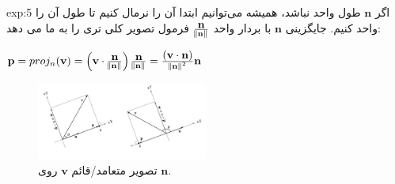 {\begin{spacing}{1.5}
\begin{example}{exp:5}
            اگر $\textbf{n}$ طول واحد نباشد، همیشه می‌توانیم ابتدا آن را نرمال کنیم تا طول آن را واحد کنیم.
            جایگزینی $\textbf{n}$ با بردار واحد $\frac{\displaystyle\textbf{n}}{\norm{\textbf{n}}}$ فرمول تصویر کلی تری را به ما می دهد:

            \begin{center}
                $\textbf{p}=proj_{n}(\textbf{v})=\left( \textbf{v}\cdot\frac{\displaystyle\textbf{n}}{\norm{\textbf{n}}} \right)\frac{\displaystyle\textbf{n}}{\norm{\textbf{n}}}=\frac{\displaystyle(\textbf{v}\cdot\textbf{n})}{\norm{\textbf{n}}^2}\textbf{n}$
            \end{center}

            \begin{figure}[H]
                \centering
                \setlength{\belowcaptionskip}{-10pt}
                \includegraphics[width=0.5\textwidth]{Images/4/4.Session.1.1.10}
                \caption{تصویر متعامد/قائم $\textbf{v}$ روی $\textbf{n}$. \textbf{\vspace{10pt}}}
                \label{fig:4.Session.1.1.10}
            \end{figure}
        \end{example}
    \end{spacing}
}

\textbf{\vspace{-10pt}}


